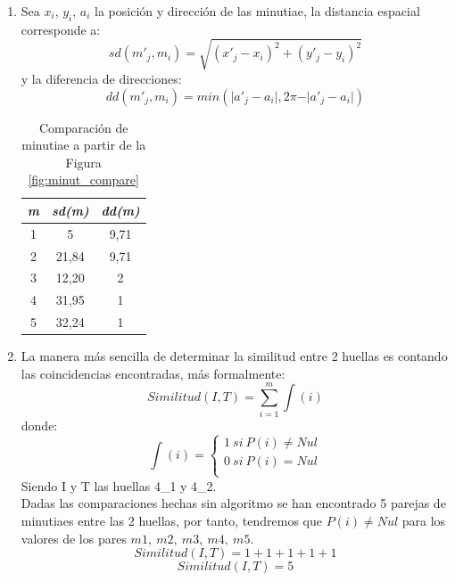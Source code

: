 \documentclass[10pt,a4paper]{article}
\begin{document}
\begin{enumerate}[label=\textbf{\alph*)}]
\pagebreak
\item
Sea $x_{i}$, $y_{i}$, $a_{i}$ la posición y dirección de las minutiae, la distancia espacial corresponde a:
\[
    sd(m'_{j}, m_{i}) = \sqrt{(x'_{j} - x_{i})^2 + (y'_{j} - y_{i})^2}
\]
y la diferencia de direcciones:
\[
    dd(m'_{j}, m_{i}) = min(\vert a'_{j} - a_{i} \vert, 2 \pi - \vert a'_{j} - a_{i} \vert)
\]

\begin{table}[h!]
\centering
\begin{tabular}{|c|c|c|}
\hline
 \textbf{\textit{m}} & \textbf{\textit{sd(m)}} & \textbf{\textit{dd(m)}} \\ \hline
  1 & 5 & 9,71\\ \hline
  2 & 21,84 & 9,71 \\ \hline
  3 & 12,20 & 2\\ \hline
  4 & 31,95 & 1\\ \hline
  5 & 32,24 & 1\\ \hline
\end{tabular}
  \caption{Comparación de minutiae a partir de la Figura \ref{fig:minut_compare}}
  \label{tabla:minut_compare}
\end{table}


\item La manera más sencilla de determinar la similitud entre 2 huellas es contando las coincidencias encontradas, más formalmente:
\[Similitud(I,T) = \sum_{i=1}^{m} \int (i)\]
donde:
 \[
    \int (i) =\left\{
                \begin{array}{ll}
                  1\:si\:P(i) \neq Nul\\
                  0\:si\:P(i) = Nul\\
                \end{array}
              \right.
  \]
Siendo I y T las huellas 4\_1 y 4\_2.\\

Dadas las comparaciones hechas sin algoritmo se han encontrado 5 parejas de minutiaes entre las 2 huellas, por tanto, tendremos que $P(i) \neq Nul$ para los valores de los pares $m1,\:m2,\:m3,\:m4,\:m5$.
 \[Similitud(I,T) = 1+1+1+1+1\]
  \[Similitud(I,T) = 5\]
\end{enumerate}

\section{}
\end{document}
